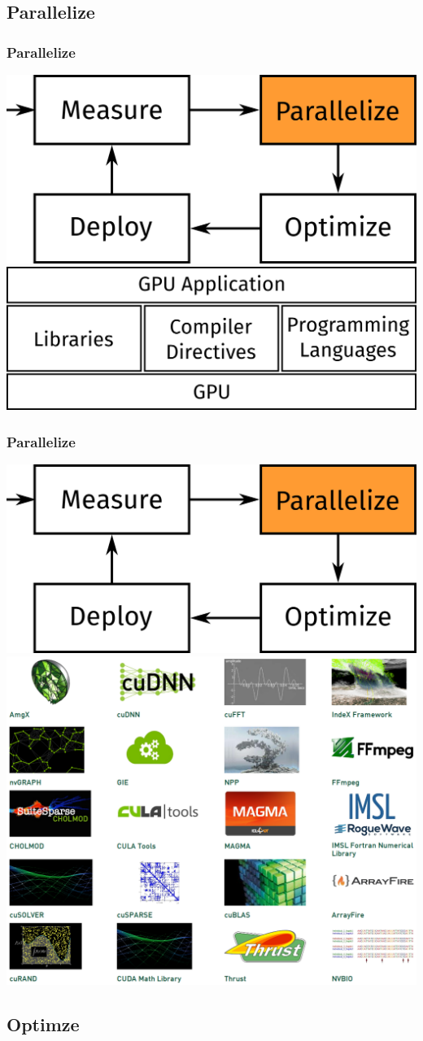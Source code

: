 \documentclass[10pt, compress]{beamer}
\begin{document}
\subsection{Parallelize}

\begin{frame}
    \frametitle{Parallelize}
    \begin{center}
    \includegraphics[width=.4\textwidth]{MPOD_P}
    \vfill
        \pause
    \includegraphics[width=.6\textwidth]{accel_apps}
    \end{center}
\end{frame}

\begin{frame}
    \frametitle{Parallelize}
    \begin{center}
    \includegraphics[width=.4\textwidth]{MPOD_P}
    \vfill
    \includegraphics[width=.5\textwidth]{accel_libs_no}
    \end{center}
\end{frame}

\subsection{Optimze}
\end{document}
